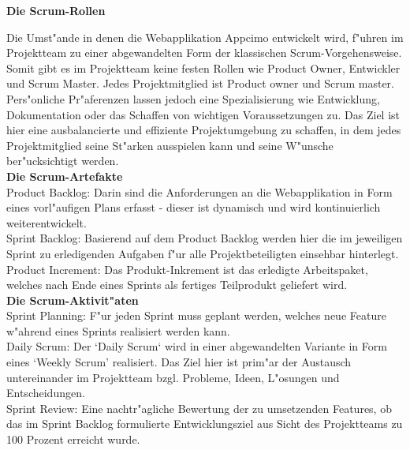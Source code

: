 \documentclass[a4paper, 11pt]{scrreprt}
\begin{document}
\textbf{Die Scrum-Rollen}

Die Umst"ande in denen die Webapplikation Appcimo entwickelt wird, f"uhren im Projektteam zu einer abgewandelten Form der klassischen Scrum-Vorgehensweise. \\

Somit gibt es im Projektteam keine festen Rollen wie Product Owner, Entwickler und Scrum Master. Jedes Projektmitglied ist Product owner und Scrum master. Pers"onliche Pr"aferenzen lassen jedoch eine Spezialisierung wie Entwicklung, Dokumentation oder das Schaffen von wichtigen Voraussetzungen zu. Das Ziel ist hier eine ausbalancierte und effiziente Projektumgebung zu schaffen, in dem jedes Projektmitglied seine St"arken ausspielen kann und seine W"unsche ber"ucksichtigt werden. \\


\textbf{Die Scrum-Artefakte} \\

Product Backlog: Darin sind die Anforderungen an die Webapplikation in Form eines vorl"aufigen Plans erfasst - dieser ist dynamisch und wird kontinuierlich weiterentwickelt. \\

Sprint Backlog: Basierend auf dem Product Backlog werden hier die im jeweiligen Sprint zu erledigenden Aufgaben f"ur alle Projektbeteiligten einsehbar hinterlegt.\\

Product Increment: Das Produkt-Inkrement ist das erledigte Arbeitspaket, welches nach Ende eines Sprints als fertiges Teilprodukt geliefert wird.\\



\textbf{Die Scrum-Aktivit"aten}\\

Sprint Planning: F"ur jeden Sprint muss geplant werden, welches neue Feature w"ahrend eines Sprints realisiert werden kann.\\

Daily Scrum: Der ‘Daily Scrum‘ wird in einer abgewandelten Variante in Form eines ‘Weekly Scrum’ realisiert. Das Ziel hier ist prim"ar der Austausch untereinander im Projektteam bzgl. Probleme, Ideen, L"osungen und Entscheidungen.\\

Sprint Review: Eine nachtr"agliche Bewertung der zu umsetzenden Features, ob  das im Sprint Backlog formulierte Entwicklungsziel aus Sicht des Projektteams zu 100 Prozent erreicht wurde.\\
\end{document}
